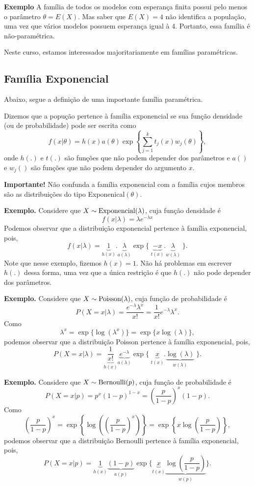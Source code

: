 \documentclass[
  letterpaper,
  DIV=11,
  numbers=noendperiod]{scrartcl}
\begin{document}
\textbf{Exemplo} A família de todos os modelos com esperança finita
possui pelo menos o parâmetro \(\theta=E(X)\). Mas saber que \(E(X)=4\)
não identifica a população, uma vez que vários modelos possuem esperança
igual à 4. Portanto, essa família é não-paramétrica.

Neste curso, estamos interessados majoritariamente em famílias
paramétricas.

\subsection{Família Exponencial}\label{famuxedlia-exponencial}

Abaixo, segue a definição de uma importante família paramétrica.

Dizemos que a popução pertence à família exponencial se sua função
densidade (ou de probabilidade) pode ser escrita como
\[f(x|\theta)=h(x)a(\theta)\exp\left\{\sum_{j=1}^k t_j(x)w_j(\theta)\right\},\]
onde \(h(.)\) e \(t(.)\) são funções que não podem depender dos
parâmetros e \(a()\) e \(w_j()\) são funções que não podem depender do
argumento \(x\).

\textbf{Importante!} Não confunda a família exponencial com a família
cujos membros são as distribuições do tipo Exponenical\((\theta)\).

\textbf{Exemplo.} Considere que \(X\sim\hbox{Exponencial}(\lambda)\),
cuja função densidade é \[f(x|\lambda)=\lambda e^{-\lambda x}\] Podemos
observar que a distribuição exponencial pertence à família exponencial,
pois,
\[f(x|\lambda)=\underbrace{1}_{h(x)}.\underbrace{\lambda}_{a(\lambda)}\exp\{\;\underbrace{-x}_{t(x)}.\underbrace{\lambda}_{w(\lambda)}\;\}.\]
Note que nesse exemplo, fizemos \(h(x)=1\). Não há problemas em escrever
\(h(.)\) dessa forma, uma vez que a única restrição é que \(h(.)\) não
pode depender dos parâmetros.

\textbf{Exemplo.} Considere que \(X\sim\hbox{Poisson}(\lambda)\), cuja
função de probabilidade é
\[P(X=x|\lambda)=\frac{e^{-\lambda}\lambda^x}{x!}=\frac{1}{x!}e^{-\lambda}\lambda^x.\]
Como \[\lambda^x = \exp\{\log(\lambda^x)\}=\exp\{x\log(\lambda)\},\]
podemos observar que a distribuição Poisson pertence à família
exponencial, pois,
\[P(X=x|\lambda)=\underbrace{\frac{1}{x!}}_{h(x)}\underbrace{e^{-\lambda}}_{a(\lambda)}\exp\{\;\underbrace{x}_{t(x)}.\underbrace{\log(\lambda)}_{w(\lambda)}\;\}.\]

\textbf{Exemplo.} Considere que \(X\sim\hbox{Bernoulli}(p)\), cuja
função de probabilidade é
\[P(X=x|p)=p^x (1-p)^{1-x}=\left(\frac{p}{1-p}\right)^x (1-p).\] Como
\[\left(\frac{p}{1-p}\right)^x = \exp\left\{\log\left(\left(\frac{p}{1-p}\right)^x\right)\right\}=\exp\left\{x\log\left(\frac{p}{1-p}\right)\right\},\]
podemos observar que a distribuição Bernoulli pertence à família
exponencial, pois,
\[P(X=x|p)=\underbrace{1}_{h(x)}\underbrace{(1-p)}_{a(p)}\exp\{\underbrace{x}_{t(x)}\underbrace{\log\left(\frac{p}{1-p}\right)}_{w(p)}\}.\]
\end{document}
